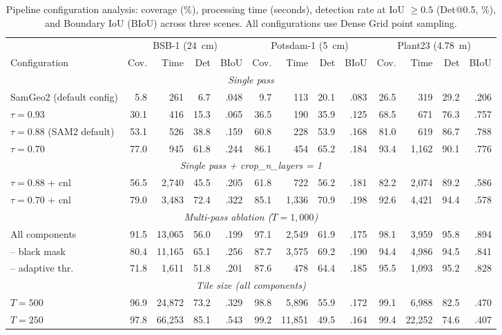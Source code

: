 \documentclass[review,11pt,authoryear]{elsarticle}
\begin{document}
\begin{table}[htbp]
\centering
\caption{Pipeline configuration analysis: coverage (\%), processing time (seconds), detection rate at IoU $\geq 0.5$ (Det@0.5, \%), and Boundary IoU (BIoU) across three scenes. All configurations use Dense Grid point sampling.}
\label{tab:config}
\scriptsize
\begin{tabular}{l@{\hspace{6pt}}rrrr@{\hspace{8pt}}rrrr@{\hspace{8pt}}rrrr}
\toprule
 & \multicolumn{4}{c}{BSB-1 (24~cm)} & \multicolumn{4}{c}{Potsdam-1 (5~cm)} & \multicolumn{4}{c}{Plant23 (4.78~m)} \\
\cmidrule(lr){2-5} \cmidrule(lr){6-9} \cmidrule(lr){10-13}
Configuration & Cov. & Time & Det & BIoU & Cov. & Time & Det & BIoU & Cov. & Time & Det & BIoU \\
\midrule
\multicolumn{13}{c}{\footnotesize\textit{Single pass}} \\
\midrule
SamGeo2 (default config) & 5.8 & 261 & 6.7 & .048 & 9.7 & 113 & 20.1 & .083 & 26.5 & 319 & 29.2 & .206 \\
$\tau = 0.93$ & 30.1 & 416 & 15.3 & .065 & 36.5 & 190 & 35.9 & .125 & 68.5 & 671 & 76.3 & .757 \\
$\tau = 0.88$ (SAM2 default) & 53.1 & 526 & 38.8 & .159 & 60.8 & 228 & 53.9 & .168 & 81.0 & 619 & 86.7 & .788 \\
$\tau = 0.70$ & 77.0 & 945 & 61.8 & .244 & 86.1 & 454 & 65.2 & .184 & 93.4 & 1{,}162 & 90.1 & .776 \\
\midrule
\multicolumn{13}{c}{\footnotesize\textit{Single pass + crop\_n\_layers = 1}} \\
\midrule
$\tau = 0.88$ + cnl & 56.5 & 2{,}740 & 45.5 & .205 & 61.8 & 722 & 56.2 & .181 & 82.2 & 2{,}074 & 89.2 & .586 \\
$\tau = 0.70$ + cnl & 79.0 & 3{,}483 & 72.4 & .322 & 85.1 & 1{,}336 & 70.9 & .198 & 92.6 & 4{,}421 & 94.4 & .578 \\
\midrule
\multicolumn{13}{c}{\footnotesize\textit{Multi-pass ablation ($T = 1{,}000$)}} \\
\midrule
All components & 91.5 & 13{,}065 & 56.0 & .199 & 97.1 & 2{,}549 & 61.9 & .175 & 98.1 & 3{,}959 & 95.8 & .894 \\
-- black mask & 80.4 & 11{,}165 & 65.1 & .256 & 87.7 & 3{,}575 & 69.2 & .190 & 94.4 & 4{,}986 & 94.5 & .841 \\
-- adaptive thr. & 71.8 & 1{,}611 & 51.8 & .201 & 87.6 & 478 & 64.4 & .185 & 95.5 & 1{,}093 & 95.2 & .828 \\
\midrule
\multicolumn{13}{c}{\footnotesize\textit{Tile size (all components)}} \\
\midrule
$T = 500$ & 96.9 & 24{,}872 & 73.2 & .329 & 98.8 & 5{,}896 & 55.9 & .172 & 99.1 & 6{,}988 & 82.5 & .470 \\
$T = 250$ & 97.8 & 66{,}253 & 85.1 & .543 & 99.2 & 11{,}851 & 49.5 & .164 & 99.4 & 22{,}252 & 74.6 & .407 \\
\bottomrule
\end{tabular}
\end{table}
\end{document}
